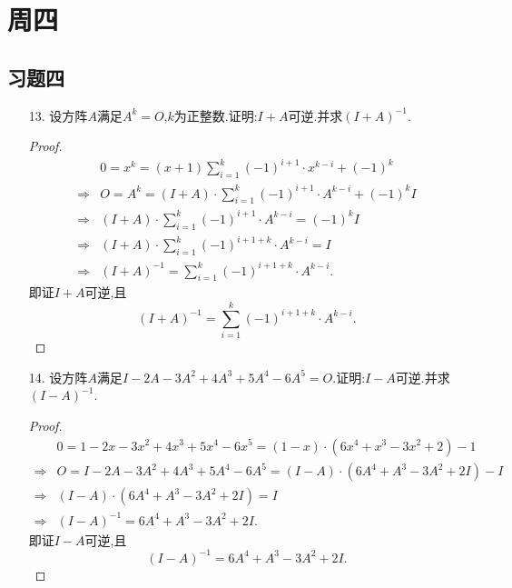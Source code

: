 \documentclass{article}
\begin{document}
\section{周四}
    \subsection{习题四}
    \begin{enumerate}
        \item [13.]设方阵$A$满足$A^k=O$,$k$为正整数.证明:$I+A$可逆.并求${(I+A)}^{-1}$.
        \begin{proof}
            \begin{align*}
                &0=x^k=(x+1)\displaystyle{\sum\limits_{i=1}^{k} {(-1)}^{i+1}\cdot x^{k-i}}+{(-1)}^{k}\\
                \Rightarrow
                &O=A^k=(I+A)\cdot \displaystyle{\sum\limits_{i=1}^{k} {(-1)}^{i+1}\cdot A^{k-i}+{(-1)}^{k}I}\\
                \Rightarrow
                &(I+A)\cdot \displaystyle{\sum\limits_{i=1}^{k} {(-1)}^{i+1}\cdot A^{k-i}={(-1)}^{k}I}\\
                \Rightarrow
                &(I+A)\cdot \displaystyle{\sum\limits_{i=1}^{k} {(-1)}^{i+1+k}}\cdot A^{k-i}=I\\
                \Rightarrow
                &{(I+A)}^{-1}=\displaystyle{\sum\limits_{i=1}^{k} {(-1)}^{i+1+k}}\cdot A^{k-i}.
            \end{align*}
            即证$I+A$可逆,且\[{(I+A)}^{-1}=\displaystyle{\sum\limits_{i=1}^{k} {(-1)}^{i+1+k}}\cdot A^{k-i}.\]
        \end{proof}
        \item [14.]设方阵$A$满足$I-2A-3A^2+4A^3+5A^4-6A^5=O$.证明:$I-A$可逆.并求${(I-A)}^{-1}$.
        \begin{proof}
            \begin{align*}
                &0=1-2x-3x^2+4x^3+5x^4-6x^5=(1-x)\cdot(6x^4+x^3-3x^2+2)-1\\
                \Rightarrow
                &O=I-2A-3A^2+4A^3+5A^4-6A^5=(I-A)\cdot(6A^4+A^3-3A^2+2I)-I\\
                \Rightarrow
                &(I-A)\cdot (6A^4+A^3-3A^2+2I)=I\\
                \Rightarrow
                &{(I-A)}^{-1}=6A^4+A^3-3A^2+2I.
            \end{align*}
            即证$I-A$可逆,且\[{(I-A)}^{-1}=6A^4+A^3-3A^2+2I.\]
        \end{proof}

\end{enumerate}
\end{document}

